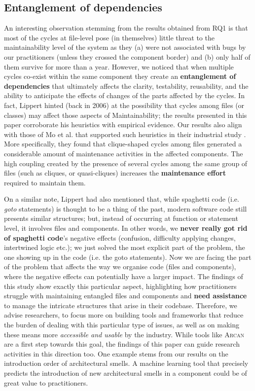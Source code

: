 \subsection{Entanglement of dependencies}
An interesting observation stemming from the results obtained from RQ1 is that most of the cycles at file-level pose (in themselves) little threat to the maintainability level of the system as they (a) were not associated with bugs by our practitioners (unless they crossed the component border) and (b) only half of them survive for more than a year.
However, we noticed that when multiple cycles co-exist within the same component they create an  \textbf{entanglement of dependencies} that ultimately affects the clarity, testability, reusability, and the ability to anticipate the effects of changes of the parts affected by the cycles.
In fact, Lippert \cite{Lippert2006} hinted (back in 2006) at the possibility that cycles among files (or classes) may affect those aspects of Maintainability; the results presented in this paper corroborate his heuristics with empirical evidence.
Our results also align with those of Mo et al. that supported such heuristics in their industrial study \cite{Mo2018}.
More specifically, they found that clique-shaped cycles among files generated a considerable amount of maintenance activities in the affected components. 
The high coupling created by the presence of several cycles among the same group of files (such as cliques, or quasi-cliques) increases the \textbf{maintenance effort} required to maintain them.

On a similar note, Lippert had also mentioned that, while spaghetti code (i.e. \emph{goto} statements) is thought to be a thing of the past, modern software code still presents similar structures; but, instead of occurring at function or statement level, it involves files and components.
In other words, we \textbf{never really got rid of spaghetti code}'s negative effects (confusion, difficulty applying changes, intertwined logic etc.); we just solved the most explicit part of the problem, the one showing up in the code (i.e. the goto statements). 
Now we are facing the part of the problem that affects the way we organise code (files and components), where the negative effects can potentially have a larger impact.
The findings of this study show exactly this particular aspect, highlighting how practitioners struggle with maintaining entangled files and components and \textbf{need assistance} to manage the intricate structures that arise in their codebase.
Therefore, we advise researchers, to focus more on building tools and frameworks that reduce the burden of dealing with this particular type of issues, as well as on making these means more \emph{accessible and usable} by the industry.
While tools like \textsc{Arcan} are a first step towards this goal, the findings of this paper can  guide research activities in this direction too.
One example stems from our results on the introduction order of architectural smells. A machine learning tool that precisely predicts the introduction of new architectural smells in a component could be of great value to practitioners.

